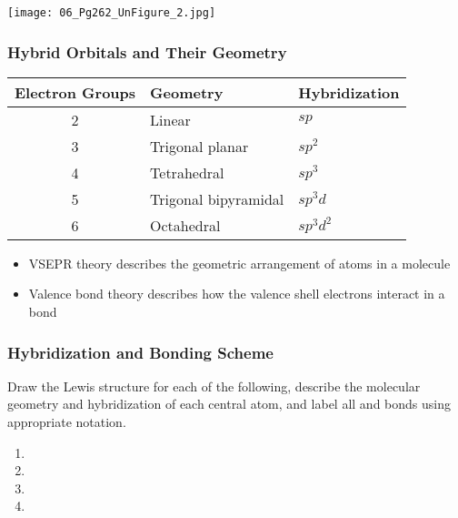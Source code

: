 \documentclass[notes=only]{beamer}
\begin{document}
\begin{frame}[c]
	\begin{center}
		\texttt{[image: 06\_Pg262\_UnFigure\_2.jpg]}
	\end{center}
\end{frame}


\begin{frame}
	\frametitle{Hybrid Orbitals and Their Geometry}

	\begin{center}
	\begin{tabular}{c l l}
		\toprule
		\textbf{Electron Groups} & \textbf{Geometry} &
		\textbf{Hybridization} \\ \midrule
		2 & Linear & $sp$ \\
		3 & Trigonal planar & $sp^2$ \\
		4 & Tetrahedral & $sp^3$ \\
		5 & Trigonal bipyramidal & $sp^3d$ \\
		6 & Octahedral & $sp^3d^2$ \\
		\bottomrule
	\end{tabular}
	\end{center}

	\begin{itemize}
		\item VSEPR theory describes the geometric arrangement of atoms
			in a molecule
		\item Valence bond theory describes how the valence shell
			electrons interact in a bond
	\end{itemize}
\end{frame}

\begin{frame}[t]
	\frametitle{Hybridization and Bonding Scheme}
	Draw the Lewis structure for each of the following, describe the
	molecular geometry and hybridization of each central atom, and label all
	\textsigma{} and \textpi{} bonds using appropriate notation.
	\begin{enumerate}
		\item {}
		\vfill
		\item {}
		\vfill
		\item {}
		\vfill
		\item {}
		\vfill
	\end{enumerate}
\end{frame}
\end{document}
